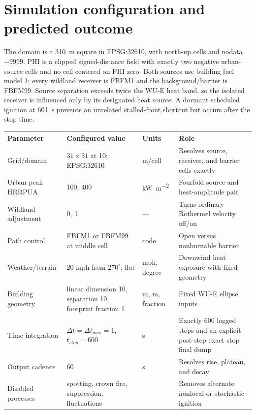 \section{Simulation configuration and predicted outcome}
The domain is a \SI{310}{m} square in EPSG:32610, with north-up
\CellSize{} cells and nodata $-9999$.  PHI is a clipped signed-distance field
with exactly two negative urban-source cells and no cell centered on PHI zero.
Both sources use building fuel model 1; every wildland receiver is FBFM1 and
the background/barrier is FBFM99.  Source separation exceeds twice the WU-E
heat band, so the isolated receiver is influenced only by its designated heat
source.  A dormant scheduled ignition at \SI{601}{s} prevents an unrelated
stalled-front shortcut but occurs after the stop time.

\begin{center}
\setlength{\tabcolsep}{3pt}
\begin{longtable}{P{0.25\textwidth}P{0.28\textwidth}P{0.13\textwidth}P{0.25\textwidth}}
\toprule Parameter & Configured value & Units & Role \\
\midrule
Grid/domain & $31\times31$ at 10; EPSG:32610 & m/cell & Resolves source, receiver, and barrier cells exactly \\
Urban peak HRRPUA & 100, 400 & \si{kW.m^{-2}} & Fourfold source and heat-amplitude pair \\
Wildland adjustment & 0, 1 & --- & Turns ordinary Rothermel velocity off/on \\
Path control & FBFM1 or FBFM99 at middle cell & code & Open versus nonburnable barrier \\
Weather/terrain & 20 mph from $270^\circ$; flat & mph, degree & Downwind heat exposure with fixed geometry \\
Building geometry & linear dimension 10, separation 10, footprint fraction 1 & m, m, fraction & Fixed WU-E ellipse inputs \\
Time integration & $\Delta t=\Delta t_{\max}=1$, $t_{stop}=600$ & s & Exactly 600 logged steps and an explicit post-step exact-stop final dump \\
Output cadence & 60 & s & Resolves rise, plateau, and decay \\
Disabled processes & spotting, crown fire, suppression, fluctuations & -- & Removes alternate nonlocal or stochastic ignition \\
\bottomrule
\end{longtable}
\end{center}

